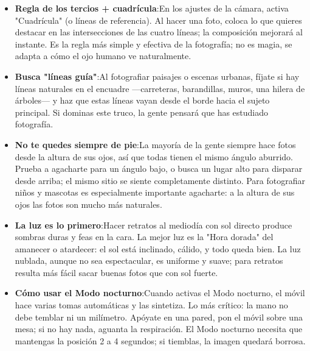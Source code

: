 \begin{itemize}
  \item \textbf{Regla de los tercios + cuadrícula}:En los ajustes de la cámara, activa "Cuadrícula" (o líneas de referencia). Al hacer una foto, coloca lo que quieres destacar en las intersecciones de las cuatro líneas; la composición mejorará al instante. Es la regla más simple y efectiva de la fotografía; no es magia, se adapta a cómo el ojo humano ve naturalmente.
  \item \textbf{Busca "líneas guía"}:Al fotografiar paisajes o escenas urbanas, fíjate si hay líneas naturales en el encuadre —carreteras, barandillas, muros, una hilera de árboles— y haz que estas líneas vayan desde el borde hacia el sujeto principal. Si dominas este truco, la gente pensará que has estudiado fotografía.
  \item \textbf{No te quedes siempre de pie}:La mayoría de la gente siempre hace fotos desde la altura de sus ojos, así que todas tienen el mismo ángulo aburrido. Prueba a agacharte para un ángulo bajo, o busca un lugar alto para disparar desde arriba; el mismo sitio se siente completamente distinto. Para fotografiar niños y mascotas es especialmente importante agacharte: a la altura de sus ojos las fotos son mucho más naturales.
  \item \textbf{La luz es lo primero}:Hacer retratos al mediodía con sol directo produce sombras duras y feas en la cara. La mejor luz es la "Hora dorada" del amanecer o atardecer: el sol está inclinado, cálido, y todo queda bien. La luz nublada, aunque no sea espectacular, es uniforme y suave; para retratos resulta más fácil sacar buenas fotos que con sol fuerte.
  \item \textbf{Cómo usar el Modo nocturno}:Cuando activas el Modo nocturno, el móvil hace varias tomas automáticas y las sintetiza. Lo más crítico: la mano no debe temblar ni un milímetro. Apóyate en una pared, pon el móvil sobre una mesa; si no hay nada, aguanta la respiración. El Modo nocturno necesita que mantengas la posición 2 a 4 segundos; si tiemblas, la imagen quedará borrosa.
\end{itemize}


